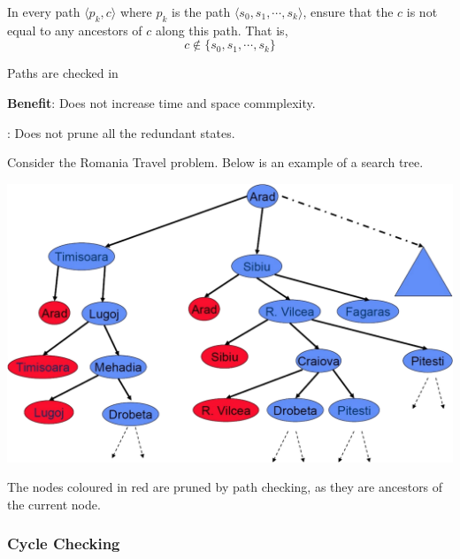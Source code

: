\begin{listu}
    \item In every path $\langle p_k, c \rangle$ where $p_k$ is the path $\langle s_0, s_1, \cdots, s_k \rangle$, ensure that the  $c$ is not equal to any ancestors of $c$ along this path. That is, \[
        c \notin \{ s_0, s_1, \cdots, s_k \}
    \]

    \item Paths are checked in 
    
    \item {\color{darkGreen}\textbf{Benefit}:} Does not increase time and space commplexity. 
    
    \item {}: Does not prune all the redundant states. 
\end{listu}

\begin{example}
    Consider the Romania Travel problem. Below is an example of a search tree. 

    \begin{center}

        \includegraphics[width=0.67\linewidth]{figures/path-checking.png}
    \end{center}

    The nodes coloured in red are pruned by path checking, as they are ancestors of the current node.
\end{example}

\subsubsection{Cycle Checking}

